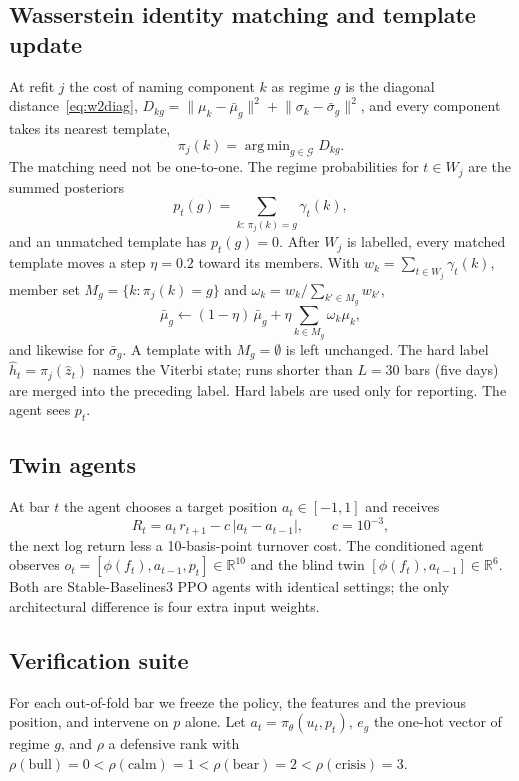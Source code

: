 \documentclass[conference]{IEEEtran}
\newcommand{\R}{\mathbb{R}}
\newcommand{\G}{\mathcal{G}}
\DeclareMathOperator*{\argmin}{arg\,min}
\begin{document}
\subsection{Wasserstein identity matching and template update}
At refit $j$ the cost of naming component $k$ as regime $g$ is the diagonal distance~\eqref{eq:w2diag}, $D_{kg}=\lVert\mu_k-\bar\mu_g\rVert^2+\lVert\sigma_k-\bar\sigma_g\rVert^2$, and every component takes its nearest template,
\begin{equation}
\pi_j(k)=\argmin_{g\in\G} D_{kg}.
\label{eq:match}
\end{equation}
The matching need not be one-to-one. The regime probabilities for $t\in W_j$ are the summed posteriors
\begin{equation}
p_t(g)=\sum_{k:\,\pi_j(k)=g}\gamma_t(k),
\label{eq:agg}
\end{equation}
and an unmatched template has $p_t(g)=0$. After $W_j$ is labelled, every matched template moves a step $\eta=0.2$ toward its members. With $w_k=\sum_{t\in W_j}\gamma_t(k)$, member set $M_g=\{k:\pi_j(k)=g\}$ and $\omega_k=w_k/\sum_{k'\in M_g}w_{k'}$,
\begin{equation}
\bar\mu_g\leftarrow(1-\eta)\,\bar\mu_g+\eta\sum_{k\in M_g}\omega_k\mu_k ,
\label{eq:update}
\end{equation}
and likewise for $\bar\sigma_g$. A template with $M_g=\emptyset$ is left unchanged. The hard label $\hat h_t=\pi_j(\hat z_t)$ names the Viterbi state; runs shorter than $L=30$ bars (five days) are merged into the preceding label. Hard labels are used only for reporting. The agent sees $p_t$.

\subsection{Twin agents}
\label{sec:twins}
At bar $t$ the agent chooses a target position $a_t\in[-1,1]$ and receives
\begin{equation}
R_t=a_t\,r_{t+1}-c\,\lvert a_t-a_{t-1}\rvert,\qquad c=10^{-3},
\label{eq:reward}
\end{equation}
the next log return less a 10-basis-point turnover cost. The conditioned agent observes $o_t=[\phi(f_t),a_{t-1},p_t]\in\R^{10}$ and the blind twin $[\phi(f_t),a_{t-1}]\in\R^{6}$. Both are Stable-Baselines3 PPO agents with identical settings; the only architectural difference is four extra input weights.

\subsection{Verification suite}
For each out-of-fold bar we freeze the policy, the features and the previous position, and intervene on $p$ alone. Let $a_t=\pi_\theta(u_t,p_t)$, $e_g$ the one-hot vector of regime $g$, and $\rho$ a defensive rank with $\rho(\text{bull})=0<\rho(\text{calm})=1<\rho(\text{bear})=2<\rho(\text{crisis})=3$.
\end{document}
